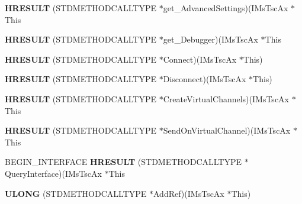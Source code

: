 \begin{DoxyCompactItemize}
\item 
\mbox{\label{struct_i_ms_tsc_ax_vtbl_a247a887c3a1341d8528b5524d7e3e6e2}} 
{\bfseries H\+R\+E\+S\+U\+LT} (S\+T\+D\+M\+E\+T\+H\+O\+D\+C\+A\+L\+L\+T\+Y\+PE $\ast$get\+\_\+\+Advanced\+Settings)(I\+Ms\+Tsc\+Ax $\ast$This
\item 
\mbox{\label{struct_i_ms_tsc_ax_vtbl_aeeb6c03ecfe69a4856e475b965e7fe65}} 
{\bfseries H\+R\+E\+S\+U\+LT} (S\+T\+D\+M\+E\+T\+H\+O\+D\+C\+A\+L\+L\+T\+Y\+PE $\ast$get\+\_\+\+Debugger)(I\+Ms\+Tsc\+Ax $\ast$This
\item 
\mbox{\label{struct_i_ms_tsc_ax_vtbl_a8cdbfaaee21521692560890390dc7beb}} 
{\bfseries H\+R\+E\+S\+U\+LT} (S\+T\+D\+M\+E\+T\+H\+O\+D\+C\+A\+L\+L\+T\+Y\+PE $\ast$Connect)(I\+Ms\+Tsc\+Ax $\ast$This)
\item 
\mbox{\label{struct_i_ms_tsc_ax_vtbl_a89aafe1bcdb66d43d2525722af767986}} 
{\bfseries H\+R\+E\+S\+U\+LT} (S\+T\+D\+M\+E\+T\+H\+O\+D\+C\+A\+L\+L\+T\+Y\+PE $\ast$Disconnect)(I\+Ms\+Tsc\+Ax $\ast$This)
\item 
\mbox{\label{struct_i_ms_tsc_ax_vtbl_a89b34607a8272bdc4c9e66e45ca5362c}} 
{\bfseries H\+R\+E\+S\+U\+LT} (S\+T\+D\+M\+E\+T\+H\+O\+D\+C\+A\+L\+L\+T\+Y\+PE $\ast$Create\+Virtual\+Channels)(I\+Ms\+Tsc\+Ax $\ast$This
\item 
\mbox{\label{struct_i_ms_tsc_ax_vtbl_a8c3a7cb2871803bf34dcac7196a7083b}} 
{\bfseries H\+R\+E\+S\+U\+LT} (S\+T\+D\+M\+E\+T\+H\+O\+D\+C\+A\+L\+L\+T\+Y\+PE $\ast$Send\+On\+Virtual\+Channel)(I\+Ms\+Tsc\+Ax $\ast$This
\item 
\mbox{\label{struct_i_ms_tsc_ax_vtbl_a594d6e6ef7df9bd962c1c9514d0931f2}} 
B\+E\+G\+I\+N\+\_\+\+I\+N\+T\+E\+R\+F\+A\+CE {\bfseries H\+R\+E\+S\+U\+LT} (S\+T\+D\+M\+E\+T\+H\+O\+D\+C\+A\+L\+L\+T\+Y\+PE $\ast$Query\+Interface)(I\+Ms\+Tsc\+Ax $\ast$This
\item 
\mbox{\label{struct_i_ms_tsc_ax_vtbl_a347182a775dd7db91109e23110432007}} 
{\bfseries U\+L\+O\+NG} (S\+T\+D\+M\+E\+T\+H\+O\+D\+C\+A\+L\+L\+T\+Y\+PE $\ast$Add\+Ref)(I\+Ms\+Tsc\+Ax $\ast$This)

\end{DoxyCompactItemize}

